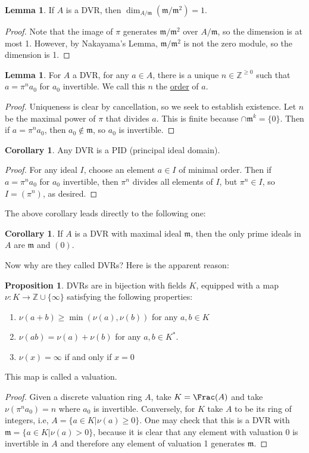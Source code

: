 \documentclass[12 pt]{article}
\theoremstyle{definition}
\newtheorem{cor}[thm]{Corollary}
\newtheorem{lemma}[thm]{Lemma}
\newtheorem{propn}[thm]{Proposition}
\renewcommand{\(}{\left(}
\renewcommand{\)}{\right)}
\newcommand\zz{\mathbb{Z}}
\newcommand\fm{{\mathfrak m}}
\begin{document}
\begin{lemma} If $A$ is a DVR, then $\dim_{A/\fm}(\fm/\fm^2)=1$.
\end{lemma}
\begin{proof} Note that the image of $\pi$ generates $\fm/\fm^2$ over $A/\fm$, so the dimension is at most 1. However, by Nakayama's Lemma, $\fm/\fm^2$ is not the zero module, so the dimension is 1.
\end{proof}

\begin{lemma} For $A$ a DVR, for any $a \in A$, there is a unique $n \in \zz^{\geq 0}$ such that $a=\pi^na_0$ for $a_0$ invertible. We call this $n$ the \uline{order} of $a$.
\end{lemma}
\begin{proof} Uniqueness is clear by cancellation, so we seek to establish existence. Let $n$ be the maximal power of $\pi$ that divides $a$. This is finite because $\cap \fm^k=\{0\}$. Then if $a=\pi^na_0$, then $a_0 \not \in \fm$, so $a_0$ is invertible.
\end{proof}

\begin{cor} Any DVR is a PID (principal ideal domain).
\label{DVR is PID}
\end{cor}
\begin{proof} For any ideal $I$, choose an element $a \in I$ of minimal order. Then if $a=\pi^n a_0$ for $a_0$ invertible, then $\pi^n$ divides all elements of $I$, but $\pi^n \in I$, so $I=(\pi^n)$, as desired.
\end{proof}

The above corollary leads directly to the following one:

\begin{cor} If $A$ is a DVR with maximal ideal $\fm$, then the only prime ideals in $A$ are $\fm$ and $(0)$.
\end{cor}


Now why are they called DVRs? Here is the apparent reason:
\begin{propn}
DVRs are in bijection with fields $K$, equipped with a map $\nu:K \to \zz \cup \{\infty\}$ satisfying the following properties:
\begin{enumerate}
\item $\nu(a+b) \geq \min(\nu(a), \nu(b))$ for any $a,b \in K$

\item $\nu(ab)=\nu(a)+\nu(b)$ for any $a,b \in K^*$.

\item $\nu(x)=\infty$ if and only if $x=0$
\end{enumerate}
This map is called a valuation.
\end{propn}
\begin{proof} Given a discrete valuation ring $A$, take $K=\Frac(A)$ and take $\nu(\pi^na_0)=n$ where $a_0$ is invertible. Conversely, for $K$ take $A$ to be its ring of integers, i.e, $A=\{a \in K| \nu(a) \geq 0\}$. One may check that this is a DVR with $\fm=\{a \in K| \nu(a)>0\}$, because it is clear that any element with valuation 0 is invertible in $A$ and therefore any element of valuation 1 generates $\fm$.
\end{proof}
\end{document}
